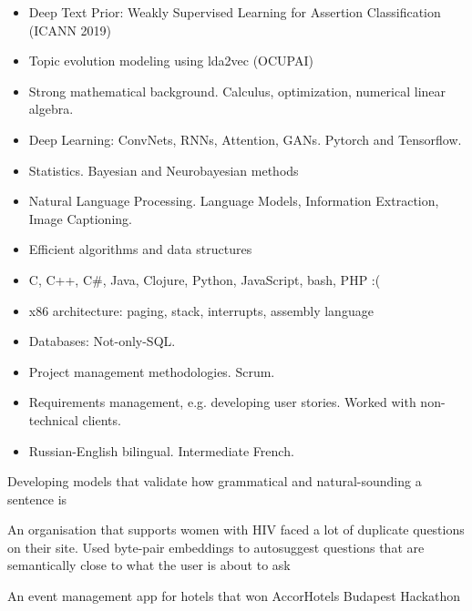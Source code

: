 
\begin{itemize}
    \item Deep Text Prior: Weakly Supervised Learning for Assertion Classification (ICANN 2019)
    \item Topic evolution modeling using lda2vec (OCUPAI\footnotemark)
\end{itemize}


\begin{itemize}
    \item Strong mathematical background. Calculus, optimization, numerical linear algebra.
    \item Deep Learning: ConvNets, RNNs, Attention, GANs. Pytorch and Tensorflow.
    \item Statistics. Bayesian and Neurobayesian methods
    \item Natural Language Processing. Language Models, Information Extraction, Image Captioning.
    \item Efficient algorithms and data structures
    \item C, C++, C\#, Java, Clojure, Python, JavaScript, bash, PHP :(
    \item x86 architecture: paging, stack, interrupts, assembly language
    \item Databases: Not-only-SQL.
    \item Project management methodologies. Scrum.
    \item Requirements management, e.g. developing user stories. Worked with non-technical clients.
    \item Russian-English bilingual. Intermediate French.
\end{itemize}


Developing models that validate how grammatical and natural-sounding a sentence is

\smallskip

An organisation that supports women with HIV faced a lot of duplicate questions on their site.
Used byte-pair embeddings to autosuggest questions that are semantically close to what the user is about to ask

\smallskip

An event management app for hotels that won AccorHotels Budapest Hackathon


